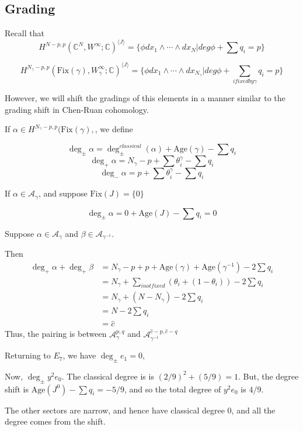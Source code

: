 \documentclass{amsart}
\theoremstyle{definition}
\newcommand{\C}{\mathbb{C}}
\newcommand{\Age}{\text{Age}}
\newcommand{\Fix}{\text{Fix}}
\begin{document}
\subsection{Grading}

Recall that 
$$H^{N-p,p}(\C^N, W^\infty;\C)^{\langle J\rangle}=\{\phi dx_1\wedge\cdots\wedge dx_N| deg \phi+\sum q_i=p\}$$

$$H^{N_\gamma-p,p}(\Fix(\gamma), W_\gamma^\infty;\C)^{\langle J\rangle}=\{\phi dx_1\wedge\cdots\wedge dx_{N_\gamma}| deg \phi+\sum_{i fixed by \gamma} q_i=p\}$$

However, we will shift the gradings of this elements in a manner similar to the grading shift in Chen-Ruan cohomology.

If $\alpha\in H^{N_\gamma-p,p}(\Fix(\gamma),$, we define

$$\deg_\pm \alpha=\deg^{classical}_\pm (\alpha)+\Age(\gamma)-\sum q_i$$
$$\deg_+ \alpha=N_\gamma-p+\sum\theta_i^\gamma -\sum q_i$$
$$\deg_- \alpha=p+\sum\theta_i^\gamma -\sum q_i$$

If $\alpha\in\mathcal{A}_\gamma$, and suppose $\Fix(J)=\{0\}$ 

$$\deg_{\pm}\alpha=0+\Age(J)-\sum q_i =0$$

Suppose $\alpha\in \mathcal{A}_\gamma$ and $\beta\in \mathcal{A}_{\gamma^{-1}}$.

Then 
\begin{align*}
\deg_+\alpha+\deg_+\beta&=N_\gamma-p+p+\Age(\gamma)+\Age(\gamma^{-1})-2\sum q_i \\
&=N_\gamma+\sum_{i not fixed} (\theta_i+(1-\theta_i))-2\sum q_i \\
&=N_\gamma+(N-N_\gamma)-2\sum q_i \\
&=N-2\sum q_i \\
&=\hat{c}
\end{align*}
Thus, the pairing is between $\mathcal{A}_\gamma^{p,q}$ and $\mathcal{A}_{\gamma^{-1}}^{\hat{c}-p,\hat{c}-q}$
 
Returning to $E_7$, we have $\deg_\pm e_1=0$,

Now, $\deg_\pm y^2 e_0$.  The classical degree is is $(2/9)^2+(5/9)=1$.  But, the degree shift is $\Age(J^0)-\sum q_i=-5/9$, and so the total degree of $y^2 e_0$ is $4/9$.

The other sectors are narrow, and hence have classical degree 0, and all the degree comes from the shift.
\end{document}
